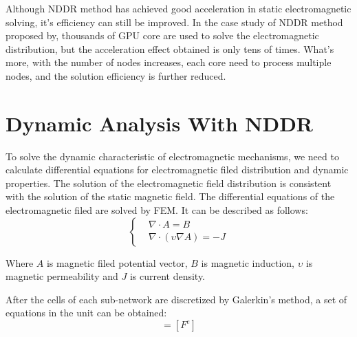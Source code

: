 \documentclass[journal,transmag]{IEEEtran}
\begin{document}
Although NDDR method has achieved good acceleration in static electromagnetic solving, it's efficiency can still be improved. In the case study of NDDR method proposed by\cite{IEEEhowto:Liu}, thousands of GPU core are used to solve the electromagnetic distribution, but the acceleration effect obtained is only tens of times. What's more, with the number of nodes increases, each core need to process multiple nodes, and the solution efficiency is further reduced.


\section{Dynamic Analysis With NDDR}
To solve the dynamic characteristic of electromagnetic mechanisms, we need to calculate differential equations for electromagnetic filed distribution and dynamic properties. The solution of the electromagnetic field distribution is consistent with the solution of the static magnetic field. The differential equations of the electromagnetic filed are solved by FEM. It can be described as follows:
\begin{equation}
\left\{
\begin{aligned}
&{\nabla\cdot}A=B\\
&\nabla\cdot({\upsilon\nabla}A)=-J
\end{aligned}
\right.
\end{equation}

Where $A$ is magnetic filed potential vector, $B$ is magnetic induction, $\upsilon$ is magnetic permeability and $J$ is current density. 

After the cells of each sub-network are discretized by Galerkin's method\cite{IEEEhowto:Rao}, a set of equations in the unit can be obtained:
\begin{equation}
[S^e][A^e]=[F^e]
\end{equation}
\end{document}
